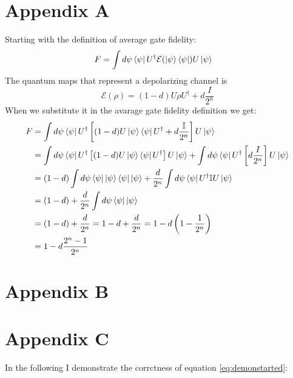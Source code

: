 \chapter*{Appendix A} 
\label{app:AppendixA}

Starting with the definition of average gate fidelity:
\begin{align*}
F &= \int d\psi \bra{\psi} U^\dagger \mathcal{E}(\ket{\psi}\bra{\psi}) U \ket{\psi}
\end{align*}
The quantum maps that represent a depolarizing channel is
\begin{equation}
\mathcal{E}(\rho) = (1-d)U\rho U^\dagger + d\frac{I}{2^n}
\end{equation}
When we substitute it in the avarage gate fidelity definition we get:
\begin{align*}
F &= \int d\psi \bra{\psi} U^\dagger \left[(1-d)U\ket{\psi}\bra{\psi}U^\dagger + d\frac{\mathbb{I}}{2^n}\right] U \ket{\psi}\\
    &= \int d\psi \bra{\psi} U^\dagger \left[(1-d)U\ket{\psi}\bra{\psi}U^\dagger\right] U \ket{\psi} + \int d\psi \bra{\psi} U^\dagger \left[d\frac{I}{2^n}\right] U \ket{\psi}\\
    &= (1-d)\int d\psi \bra{\psi}\ket{\psi}\bra{\psi}\ket{\psi} + \frac{d}{2^n}\int d\psi \bra{\psi}U^\dagger \mathbb{I} U\ket{\psi}\\
    &= (1-d) + \frac{d}{2^n}\int d\psi \bra{\psi}\ket{\psi}\\
    &= (1-d) + \frac{d}{2^n} = 1 - d + \frac{d}{2^n} = 1 - d\left(1 - \frac{1}{2^n}\right)\\
    &= 1 - d\frac{2^n - 1}{2^n}
\end{align*}

\chapter*{Appendix B}
\label{app:AppendixB}

\chapter*{Appendix C}
\label{app:AppendixC}

In the following I demonstrate the corrctness of equation \ref{eq:demonstarted}:

